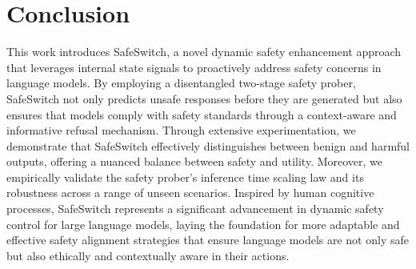 \section{Conclusion}
This work introduces SafeSwitch, a novel dynamic safety enhancement approach that leverages internal state signals to proactively address safety concerns in language models. By employing a disentangled two-stage safety prober, SafeSwitch not only predicts unsafe responses before they are generated but also ensures that models comply with safety standards through a context-aware and informative refusal mechanism. Through extensive experimentation, we demonstrate that SafeSwitch effectively distinguishes between benign and harmful outputs, offering a nuanced balance between safety and utility. Moreover, we empirically validate the safety prober's inference time scaling law and its robustness across a range of unseen scenarios. Inspired by human cognitive processes, SafeSwitch represents a significant advancement in dynamic safety control for large language models, laying the foundation for more adaptable and effective safety alignment strategies that ensure language models are not only safe but also ethically and contextually aware in their actions.

